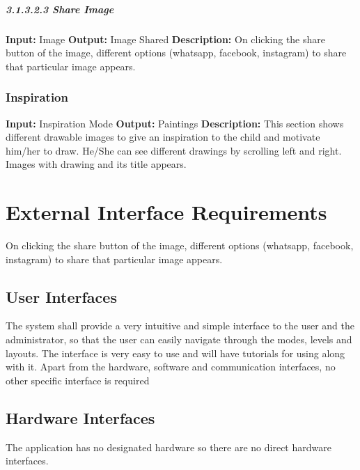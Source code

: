 \documentclass{scrreprt}
\begin{document}
\paragraph{3.1.3.2.3 Share Image}
\hfill \vspace{2.5mm} \break 
\textbf{Input:} Image \newline
\textbf{Output:} Image Shared
\vspace{1mm}\newline
\textbf{Description:} \newline 
On clicking the share button of the image, different options (whatsapp, facebook, instagram) to share that particular image appears.


\subsection{Inspiration}
\textbf{Input:} Inspiration Mode \newline
\textbf{Output:} Paintings
\vspace{1mm}\newline
\textbf{Description:} \newline 
This section shows different drawable images to give an inspiration to the child and motivate him/her to draw. He/She can see different drawings by scrolling left and right. Images with drawing and its title appears.

\chapter{External Interface Requirements}
On clicking the share button of the image, different options (whatsapp, facebook, instagram) to share that particular image appears.

\section{User Interfaces}
The system shall provide a very intuitive and simple interface to the user and the administrator, so that the user can easily navigate through the modes, levels and layouts.
The interface is very easy to use and will have tutorials for using along with it.
Apart from the hardware, software and communication interfaces, no other specific interface is required 

\section{Hardware Interfaces}
The application has no designated hardware so there are no direct hardware interfaces.
\end{document}
